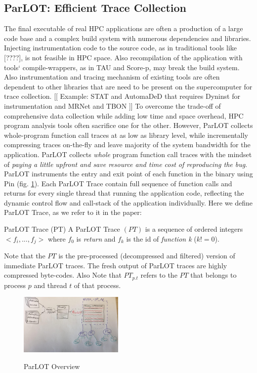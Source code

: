 \subsection{ParLOT: Efficient Trace Collection}
\label{subsec:parlot}

The final executable of real HPC applications are often a production of a large code base and a complex build system with numerous dependencies and libraries. Injecting instrumentation code to the source code, as in traditional tools like [????], is not feasible in HPC space. Also recompilation of the application with tools` compile-wrappers, as in TAU\cite{tau} and Score-p\cite{scorep}, may break the build system.
Also instrumentation and tracing mechanism of existing tools are often dependent to other libraries that are need to be present on the supercomputer for trace collection. [[ Example: STAT\cite{stat} and AutomaDeD\cite{automaded-laguna} that requires Dyninst\cite{dyninst} for instrumentation and MRNet\cite{mrnet} and TBON \cite{tbon}]]
%
To overcome the trade-off of comprehensive data collection while adding low time and space overhead, HPC program analysis tools often sacrifice one for the other. However, ParLOT collects whole-program function call traces at as low as library level, while incrementally compressing traces on-the-fly and leave majority of the system bandwidth for the application.
%
ParLOT collects \textit{whole} program function call traces with the mindset of \textit{paying a little upfront and save resource and time cost of reproducing the bug}.
%
ParLOT instruments the entry and exit point of each function in the binary using Pin\cite{pin} (fig. \ref{fig.parlotOverview}). Each ParLOT Trace contain full sequence of function calls and returns for every single thread that running the application code, reflecting the dynamic control flow and call-stack of the application individually.
%
Here we define ParLOT Trace, as we refer to it in the paper:

\begin{definition}{ParLOT Trace (PT)}
A ParLOT Trace $(PT)$ is a sequence of ordered integers $<f_i,...,f_j>$ where $f_0$ is \textit{return} and $f_k$ is the id of \textit{function k} ($k!=0$).
\end{definition}
%
Note that the $PT$ is the pre-processed (decompressed and filtered) version of immediate ParLOT traces. The fresh output of ParLOT traces are highly compressed byte-codes.
%
Also Note that $PT_{p.t}$ refers to the $PT$ that belongs to process $p$ and thread $t$ of that process.
%
\begin{figure}[t]
\caption{ParLOT Overview}
\includegraphics[width=0.45\textwidth]{figs/parlotOverview.jpg}
\label{fig.parlotOverview}
\end{figure}



